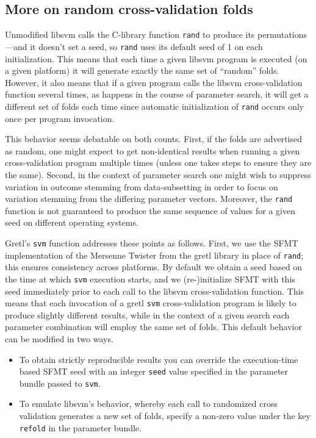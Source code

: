 \documentclass{article}
\begin{document}
\subsection{More on random cross-validation folds}
\label{sec:random-folds}

Unmodified \textsf{libsvm} calls the C-library function \texttt{rand}
to produce its permutations---and it doesn't set a seed, so
\texttt{rand} uses its default seed of 1 on each initialization. This
means that each time a given \textsf{libsvm} program is executed (on a
given platform) it will generate exactly the same set of ``random''
folds. However, it also means that if a given program calls the
\textsf{libsvm} cross-validation function several times, as happens in
the course of parameter search, it will get a different set of folds
each time since automatic initialization of \texttt{rand} occurs only
once per program invocation.

This behavior seems debatable on both counts. First, if the folds are
advertised as random, one might expect to get non-identical results
when running a given cross-validation program multiple times (unless
one takes steps to ensure they are the same). Second, in the context
of parameter search one might wish to suppress variation in outcome
stemming from data-subsetting in order to focus on variation stemming
from the differing parameter vectors. Moreover, the \texttt{rand}
function is not guaranteed to produce the same sequence of values for
a given seed on different operating systems.

Gretl's \texttt{svm} function addresses these points as
follows. First, we use the \textsf{SFMT} implementation of the
Mersenne Twister from the gretl library in place of \texttt{rand};
this ensures consistency across platforms. By default we obtain a seed
based on the time at which \texttt{svm} execution starts, and we
(re-)initialize \textsf{SFMT} with this seed immediately prior to each
call to the \textsf{libsvm} cross-validation function. This means that
each invocation of a gretl \texttt{svm} cross-validation program is
likely to produce slightly different results, while in the context of
a given search each parameter combination will employ the same set of
folds. This default behavior can be modified in two ways.
\begin{itemize}
\item To obtain strictly reproducible results you can override the
  execution-time based \textsf{SFMT} seed with an integer
  \texttt{seed} value specified in the parameter bundle passed to
  \texttt{svm}.
\item To emulate \textsf{libsvm}'s behavior, whereby each call to
  randomized cross validation generates a new set of folds, specify a
  non-zero value under the key \texttt{refold} in the parameter
  bundle.
\end{itemize}
\end{document}
